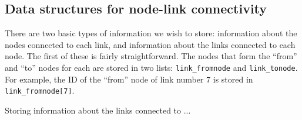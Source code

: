 \documentclass[12pt]{amsart}
\newcommand{\code}[1]{{\tt #1}}
\begin{document}
\subsection{Data structures for node-link connectivity}

There are two basic types of information we wish to store: information about the nodes connected to each link, and information about the links connected to each node.
The first of these is fairly straightforward. 
The nodes that form the ``from'' and ``to'' nodes for each are stored in two lists: \code{link\_fromnode} and \code{link\_tonode}. For example, the ID of the ``from'' node of link number 7 is stored in \code{link\_fromnode[7]}. 

Storing information about the links connected to ...





%
%
%
%
%
%        
%
%
%
%
%

%	
			
\end{document}
